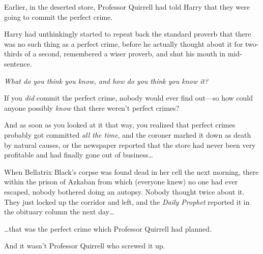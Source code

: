 \later

Earlier, in the deserted store, Professor Quirrell had told Harry that they were going to commit the perfect crime.

Harry had unthinkingly started to repeat back the standard proverb that there was no such thing as a perfect crime, before he actually thought about it for two-thirds of a second, remembered a wiser proverb, and shut his mouth in mid-sentence.

\emph{What do you think you know, and how do you think you know it?}

If you \emph{did} commit the perfect crime, nobody would ever find out---so how could anyone possibly \emph{know} that there weren't perfect crimes?

And as soon as you looked at it that way, you realized that perfect crimes probably got committed \emph{all the time}, and the coroner marked it down as death by natural causes, or the newspaper reported that the store had never been very profitable and had finally gone out of business{\ldots}

When Bellatrix Black's corpse was found dead in her cell the next morning, there within the prison of Azkaban from which (everyone knew) no one had ever escaped, nobody bothered doing an autopsy. Nobody thought twice about it. They just locked up the corridor and left, and the \emph{Daily Prophet} reported it in the obituary column the next day{\ldots}

{\ldots}that was the perfect crime which Professor Quirrell had planned.

And it wasn't Professor Quirrell who screwed it up.
